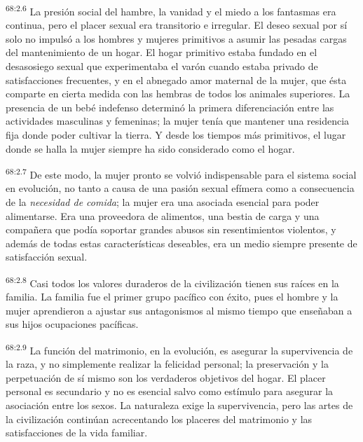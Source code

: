 \par
\textsuperscript{68:2.6} La presión social del hambre, la vanidad y el miedo a los fantasmas era continua, pero el placer sexual era transitorio e irregular. El deseo sexual por sí solo no impulsó a los hombres y mujeres primitivos a asumir las pesadas cargas del mantenimiento de un hogar. El hogar primitivo estaba fundado en el desasosiego sexual que experimentaba el varón cuando estaba privado de satisfacciones frecuentes, y en el abnegado amor maternal de la mujer, que ésta comparte en cierta medida con las hembras de todos los animales superiores. La presencia de un bebé indefenso determinó la primera diferenciación entre las actividades masculinas y femeninas; la mujer tenía que mantener una residencia fija donde poder cultivar la tierra. Y desde los tiempos más primitivos, el lugar donde se halla la mujer siempre ha sido considerado como el hogar.

\par
\textsuperscript{68:2.7} De este modo, la mujer pronto se volvió indispensable para el sistema social en evolución, no tanto a causa de una pasión sexual efímera como a consecuencia de la \textit{necesidad de comida}; la mujer era una asociada esencial para poder alimentarse. Era una proveedora de alimentos, una bestia de carga y una compañera que podía soportar grandes abusos sin resentimientos violentos, y además de todas estas características deseables, era un medio siempre presente de satisfacción sexual.

\par
\textsuperscript{68:2.8} Casi todos los valores duraderos de la civilización tienen sus raíces en la familia. La familia fue el primer grupo pacífico con éxito, pues el hombre y la mujer aprendieron a ajustar sus antagonismos al mismo tiempo que enseñaban a sus hijos ocupaciones pacíficas.

\par
\textsuperscript{68:2.9} La función del matrimonio, en la evolución, es asegurar la supervivencia de la raza, y no simplemente realizar la felicidad personal; la preservación y la perpetuación de sí mismo son los verdaderos objetivos del hogar. El placer personal es secundario y no es esencial salvo como estímulo para asegurar la asociación entre los sexos. La naturaleza exige la supervivencia, pero las artes de la civilización continúan acrecentando los placeres del matrimonio y las satisfacciones de la vida familiar.


